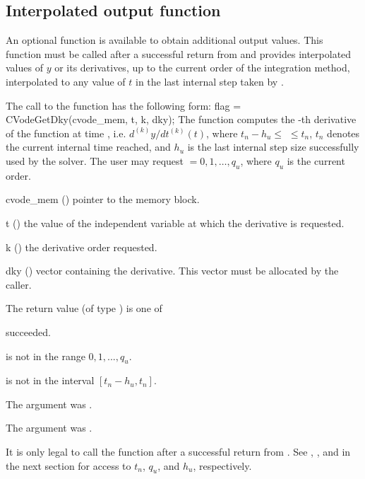 \subsection{Interpolated output function}\label{ss:optional_dky}

An optional function  is available to obtain additional output
values.  This function must be called after a successful return from 
and provides interpolated values of $y$ or its derivatives, up to the current
order of the integration method, interpolated to any value of $t$ in the last
internal step taken by {\cvode}.

The call to the  function has the following form:
{
  flag = CVodeGetDky(cvode\_mem, t, k, dky);
}
{
  The function  computes the -th derivative of the 
  function at time , i.e. $d^{(k)}y/dt^{(k)} (t)$, where $t_n - h_u \le$
   $\le t_n$, $t_n$ denotes the current internal time reached, and $h_u$
  is the  last internal step size successfully used by the solver.  The user 
  may request  $= 0, 1, \ldots, q_u$, where $q_u$ is the current order. 
}
{
  \begin{args}
  \item[cvode\_mem] ()
    pointer to the {\cvode} memory block.
  \item[t] () the value of the independent variable at
    which the derivative is requested.
  \item[k] () the derivative order requested.
  \item[dky] ()
    vector containing the derivative.
    This vector must be allocated by the caller. 
  \end{args}
}
{
  The return value  (of type ) is one of
  \begin{args} 
  \item[\Id{CV\_SUCCESS}]
     succeeded.
  \item[\Id{CV\_BAD\_K}] 
     is not in the range $0, 1, ..., q_u$.
  \item[\Id{CV\_BAD\_T}] 
     is not in the interval $[t_n - h_u , t_n]$.
  \item[\Id{CV\_BAD\_DKY}] 
    The  argument was .
  \item[\Id{CV\_MEM\_NULL}] 
    The  argument was .
  \end{args}

}
{
  It is only legal to call the function  after a 
  successful return from . See ,
  , and  in the next section for
  access to $t_n$, $q_u$, and $h_u$, respectively.
}

